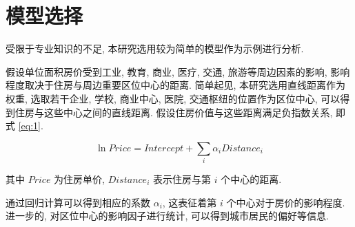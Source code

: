 \section{模型选择}
受限于专业知识的不足, 本研究选用较为简单的模型作为示例进行分析.

假设单位面积房价受到工业, 教育, 商业, 医疗, 交通, 旅游等周边因素的影响, 影响程度取决于住房与周边重要区位中心的距离.
简单起见, 本研究选用直线距离作为权重, 选取若干企业, 学校, 商业中心, 医院, 交通枢纽的位置作为区位中心, 可以得到住房与这些中心之间的直线距离.
假设住房价值与这些距离满足负指数关系, 即式 \eqref{eq:1}.

\begin{equation} \label{eq:1}
    \ln Price = Intercept + \sum_i \alpha_i Distance_i
\end{equation}

其中 $Price$ 为住房单价, $Distance_i$ 表示住房与第 $i$ 个中心的距离.

通过回归计算可以得到相应的系数 $\alpha_i$, 这表征着第 $i$ 个中心对于房价的影响程度.
进一步的, 对区位中心的影响因子进行统计, 可以得到城市居民的偏好等信息.
